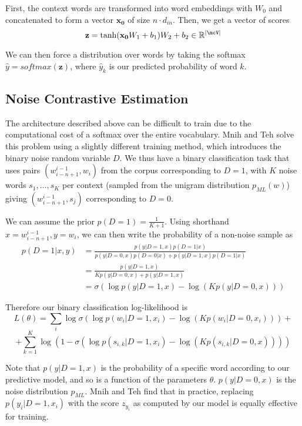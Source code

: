 \documentclass[11pt]{article}
\begin{document}
First, the context words are transformed into word embeddings with $W_0$ and concatenated to form a vector $ \mathbf{x_0}$ of size $n \cdot  d_{in}$. Then, we get a vector of scores
$$\mathbf{z} = \tanh(\mathbf{x_0}W_1 + b_1)W_2 + b_2 \in \mathbb{R}^{|\mcV|}$$

We can then force a distribution over words by taking the softmax $\widehat{y} = softmax(\mathbf{z})$, where $\widehat{y}_k$ is our predicted probability of word $k$.

\subsection{Noise Contrastive Estimation}

The architecture described above can be difficult to train due to the computational cost of a softmax over the entire vocabulary. Mnih and Teh solve this problem using a slightly different training method, which introduces the binary noise random variable $D$. We thus have a binary classification task that uses pairs $(w_{i-n+1}^{i-1}, w_i)$ from the corpus corresponding to $D = 1$, with $K$ noise words $s_1, \ldots, s_K$ per context (sampled from the unigram distribution $p_{ML}(w)$) giving $(w_{i-n+1}^{i-1}, s_j)$ corresponding to $D = 0$.

We can assume the prior $p(D = 1) = \frac{1}{K+1}$. Using shorthand $x = w_{i-n+1}^{i-1}, y = w_i$, we can then write the probability of a non-noise sample as
\begin{align*}
p(D = 1 | x, y) & = \frac{p(y | D = 1, x)p(D = 1|x)}{p(y | D=0, x)p(D = 0|x) + p(y|D = 1, x)p(D = 1 | x)} \\
& = \frac{p(y | D = 1, x)}{Kp(y | D=0, x) + p(y|D = 1, x)} \\
& = \sigma(\log p(y | D = 1, x) - \log (Kp(y | D = 0, x)))
\end{align*}

Therefore our binary classification log-likelihood is
$$L(\theta) = \sum_i \log \sigma(\log p(w_i | D = 1, x_i) - \log (Kp(w_i | D = 0, x_i))) + $$
$$+\sum_{k=1}^K \log (1 - \sigma(\log p(s_{i,k} | D = 1 , x_i) - \log(Kp(s_{i,k}| D = 0, x))))$$

Note that $p(y | D = 1, x)$ is the probability of a specific word according to our predictive model, and so is a function of the parameters $\theta$. $p(y | D = 0, x)$ is the noise distribution $p_{ML}$. Mnih and Teh find that in practice, replacing $p(y_i | D = 1, x_i)$ with the score $z_{y_i}$ as computed by our model is equally effective for training.
\end{document}
